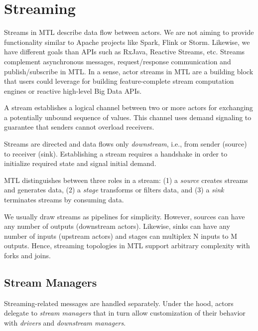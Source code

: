 \section{Streaming\experimental}
\label{streaming}

Streams in MTL describe data flow between actors. We are not aiming to provide
functionality similar to Apache projects like Spark, Flink or Storm. Likewise,
we have different goals than APIs such as RxJava, Reactive Streams, etc.
Streams complement asynchronous messages, request/response communication and
publish/subscribe in MTL. In a sense, actor streams in MTL are a building
block that users could leverage for building feature-complete stream
computation engines or reactive high-level Big Data APIs.

A stream establishes a logical channel between two or more actors for
exchanging a potentially unbound sequence of values. This channel uses demand
signaling to guarantee that senders cannot overload receivers.


Streams are directed and data flows only \emph{downstream}, i.e., from sender
(source) to receiver (sink). Establishing a stream requires a handshake in
order to initialize required state and signal initial demand.


MTL distinguishes between three roles in a stream: (1) a \emph{source} creates
streams and generates data, (2) a \emph{stage} transforms or filters data, and
(3) a \emph{sink} terminates streams by consuming data.

We usually draw streams as pipelines for simplicity. However, sources can have
any number of outputs (downstream actors). Likewise, sinks can have any number
of inputs (upstream actors) and stages can multiplex N inputs to M outputs.
Hence, streaming topologies in MTL support arbitrary complexity with forks and
joins.

\subsection{Stream Managers}

Streaming-related messages are handled separately. Under the hood, actors
delegate to \emph{stream managers} that in turn allow customization of their
behavior with \emph{drivers} and \emph{downstream managers}.


